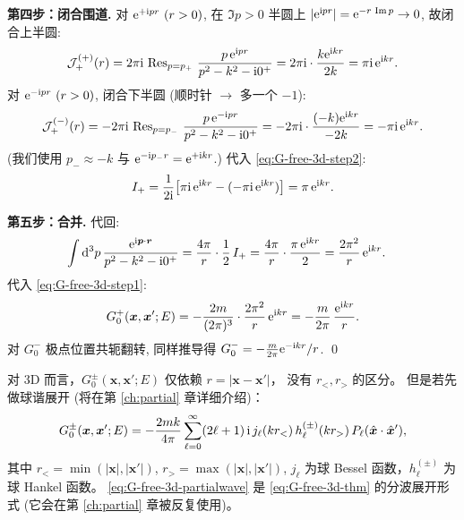 \begin{proof*}
\textbf{第四步：闭合围道.}
对 $\mathrm{e}^{+\mathrm{i} pr}\ (r>0)$, 在 $\Im p>0$ 半圆上 $|\mathrm{e}^{\mathrm{i} pr}|=\mathrm{e}^{-r\,\Im p}\to 0$,
故闭合上半圆:
\begin{equation}
  \mathcal J_+^{(+)}(r)
  = 2\pi\mathrm{i}\,\operatorname{Res}_{p=p_+}\,\frac{p\,\mathrm{e}^{\mathrm{i} pr}}{p^2-k^2-\mathrm{i} 0^+}
  = 2\pi\mathrm{i}\cdot\frac{k\mathrm{e}^{\mathrm{i} kr}}{2k}
  = \pi\mathrm{i}\,\mathrm{e}^{\mathrm{i} kr}.
\end{equation}
对 $\mathrm{e}^{-\mathrm{i} pr}\ (r>0)$, 闭合下半圆 (顺时针 $\to$ 多一个 $-1$):
\begin{equation}
  \mathcal J_+^{(-)}(r)
  = -2\pi\mathrm{i}\,\operatorname{Res}_{p=p_-}\,\frac{p\,\mathrm{e}^{-\mathrm{i} pr}}{p^2-k^2-\mathrm{i} 0^+}
  = -2\pi\mathrm{i}\cdot\frac{(-k)\mathrm{e}^{\mathrm{i} kr}}{-2k}
  = -\pi\mathrm{i}\,\mathrm{e}^{\mathrm{i} kr}.
\end{equation}
(我们使用 $p_-\approx -k$ 与 $\mathrm{e}^{-\mathrm{i} p_- r}=\mathrm{e}^{+\mathrm{i} kr}$.)
代入 \eqref{eq:G-free-3d-step2}:
\begin{equation}
  I_+ = \frac{1}{2\mathrm{i}}\bigl[\pi\mathrm{i}\,\mathrm{e}^{\mathrm{i} kr} - (-\pi\mathrm{i}\,\mathrm{e}^{\mathrm{i} kr})\bigr]
      = \pi\,\mathrm{e}^{\mathrm{i} kr}.
\end{equation}

\textbf{第五步：合并.}
代回:
\begin{align}
  \int\mathrm{d}^3 p\,\frac{\mathrm{e}^{\mathrm{i}\bm p\cdot\bm r}}{p^2-k^2-\mathrm{i} 0^+}
  &= \frac{4\pi}{r}\cdot\frac12\,I_+
   = \frac{4\pi}{r}\cdot\frac{\pi\,\mathrm{e}^{\mathrm{i} kr}}{2}
   = \frac{2\pi^2}{r}\,\mathrm{e}^{\mathrm{i} kr}.
\end{align}
代入 \eqref{eq:G-free-3d-step1}:
\begin{equation}
  G_0^+(\bm x,\bm x';E)
  = -\frac{2m}{(2\pi)^3}\cdot\frac{2\pi^2}{r}\,\mathrm{e}^{\mathrm{i} kr}
  = -\frac{m}{2\pi}\,\frac{\mathrm{e}^{\mathrm{i} kr}}{r}.
\end{equation}
对 $G_0^-$ 极点位置共轭翻转, 同样推导得
$G_0^-=-\frac{m}{2\pi}\mathrm{e}^{-\mathrm{i} kr}/r$. \qed
\end{proof*}

\begin{remark}[$r_{<},r_{>}$ 表述]
对 3D 而言，$G_0^\pm(\bm x,\bm x';E)$ 仅依赖 $r=|\bm x-\bm x'|$，
没有 $r_{<},r_{>}$ 的区分。
但是若先做球谐展开 (将在第 \ref{ch:partial} 章详细介绍)：
\begin{equation}\label{eq:G-free-3d-partialwave}
  G_0^\pm(\bm x,\bm x';E)
  = -\frac{2mk}{4\pi}\sum_{\ell=0}^\infty(2\ell+1)\,
    \mathrm{i}\,j_\ell(kr_<)\,h_\ell^{(\pm)}(kr_>)\,P_\ell(\hat{\bm x}\cdot\hat{\bm x}'),
\end{equation}
其中 $r_<=\min(|\bm x|,|\bm x'|)$, $r_>=\max(|\bm x|,|\bm x'|)$,
$j_\ell$ 为球 Bessel 函数，$h_\ell^{(\pm)}$ 为球 Hankel 函数。
\eqref{eq:G-free-3d-partialwave} 是 \eqref{eq:G-free-3d-thm} 的分波展开形式
(它会在第 \ref{ch:partial} 章被反复使用)。
\end{remark}

